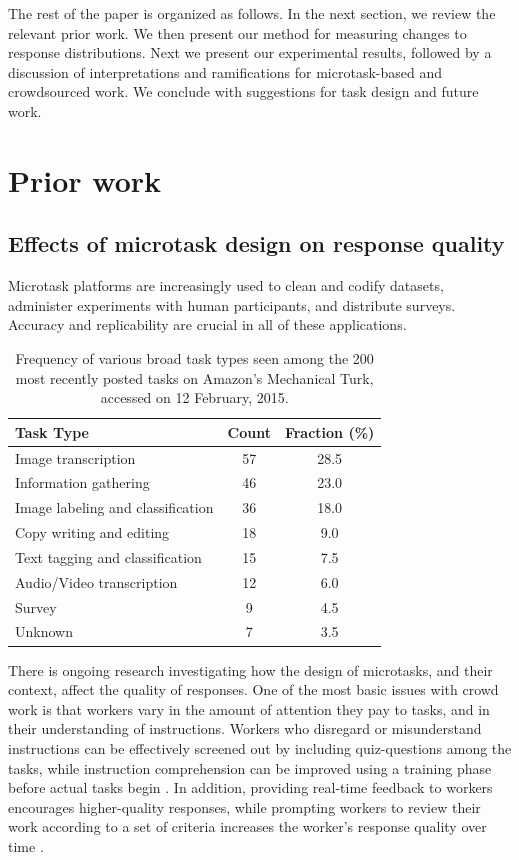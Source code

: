 \documentclass{sigchi}
\begin{document}
The rest of the paper is organized as follows.  In the next section, we 
review the relevant prior work.  We then present our method for 
measuring changes to response distributions.
Next we present our experimental results, followed by a discussion 
of interpretations and ramifications for microtask-based and crowdsourced 
work.  We conclude with suggestions for task design and future work.

\section{Prior work}
\subsection{Effects of microtask design on response quality}
Microtask platforms are increasingly used to clean and codify datasets,
administer experiments with human participants, and distribute 
surveys.  Accuracy and replicability are crucial in all of these 
applications.

\begin{table}
\centering
\begin{tabular}{l c c}
\toprule
Task Type & Count & Fraction (\%) \\
\toprule
Image transcription & 57 & 28.5 \\
Information gathering & 46 & 23.0 \\
Image labeling and classification & 36 & 18.0 \\
Copy writing and editing & 18 & 9.0 \\
Text tagging and classification & 15 & 7.5 \\
Audio/Video transcription & 12 & 6.0 \\
Survey & 9 & 4.5 \\
Unknown & 7 & 3.5 \\
\bottomrule
\end{tabular}
\caption{
	Frequency of various broad task types seen among the 200 most 
	recently posted tasks on Amazon's Mechanical Turk, 
	accessed on 12 February, 2015.
}
\label{table:task_composition}
\end{table}

There is ongoing research investigating how the design of microtasks,
and their context, affect the quality of responses.  
One of the most basic issues with crowd work
is that workers vary in the amount of attention they pay to tasks, 
and in their understanding of instructions.
Workers who disregard or misunderstand instructions can be effectively 
screened out by including quiz-questions among the tasks, while
instruction comprehension can be improved using a training phase before
actual tasks begin
\cite{le2010ensuring,kazai2013analysis}. %
In addition, providing real-time feedback to workers encourages  
higher-quality responses, while prompting workers to review their work
according to a set of criteria increases the worker's response quality 
over time \cite{Dow20121013}.
\end{document}
